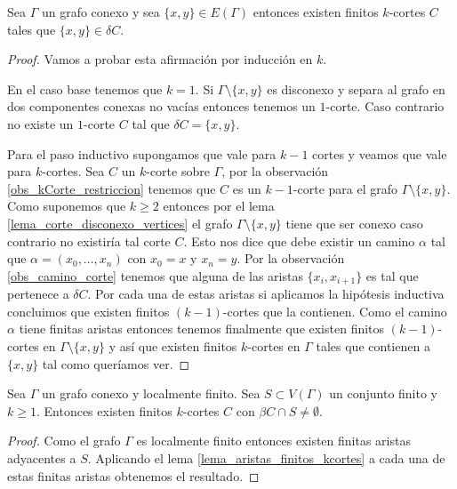 \documentclass[tesis.tex]{subfiles}
\begin{document}
\begin{prop}\label{lema_aristas_finitos_kcortes}
	Sea $\Gamma$ un grafo conexo y sea $\{x,y\} \in E(\Gamma)$ entonces existen finitos $k$-cortes $C$ tales que $\{x,y\} \in \delta C$.
\end{prop}

\begin{proof}
	Vamos a probar esta afirmación por inducción en $k$.
	
	En el caso base tenemos que $k=1$. 
	Si $\Gamma \setminus \{x,y\}$ es disconexo y separa al grafo en dos componentes conexas no vacías entonces tenemos un $1$-corte. 
	Caso contrario no existe un $1$-corte $C$ tal que $\delta C = \{x,y\}$.
	
	Para el paso inductivo supongamos que vale para $k-1$ cortes y veamos que vale para $k$-cortes.
	Sea $C$ un $k$-corte sobre $\Gamma$, por la observación \ref{obs_kCorte_restriccion} tenemos que $C$ es un $k-1$-corte para el grafo $\Gamma \setminus \{x,y\}$.
	Como suponemos que $k \ge 2$ entonces por el lema \ref{lema_corte_disconexo_vertices} el grafo $\Gamma \setminus \{x,y\}$ tiene que ser conexo caso contrario no existiría tal corte $C$.
	Esto nos dice que debe existir un camino $\alpha$ tal que $\alpha = (x_{0}, \dots, x_{n})$ con $x_{0} = x$ y $x_{n} = y$.
	Por la observación \ref{obs_camino_corte} tenemos que alguna de las aristas $\{x_{i},x_{i+1}\}$ es tal que pertenece a $\delta C$.
	Por cada una de estas aristas si aplicamos la hipótesis inductiva concluimos que existen finitos $(k-1)$-cortes que la contienen.
	Como el camino $\alpha$ tiene finitas aristas entonces tenemos finalmente que existen finitos $(k-1)$-cortes en $\Gamma \setminus \{x,y\}$ y así que existen finitos $k$-cortes en $\Gamma$ tales que contienen a $\{x,y\}$ tal como queríamos ver.
	
\end{proof}




\begin{coro}\label{lema_finitos_kcortes}
	Sea $\Gamma$ un grafo conexo y localmente finito.
	Sea $S \subset V(\Gamma)$ un conjunto finito y $k\ge 1$.
	Entonces existen finitos $k$-cortes $C$ con $\beta C \cap S \neq \emptyset$.
\end{coro}	

\begin{proof}
	Como el grafo $\Gamma$ es localmente finito entonces existen finitas aristas adyacentes a $S$.
	Aplicando el lema \ref{lema_aristas_finitos_kcortes} a cada una de estas finitas aristas obtenemos el resultado.	
\end{proof}
	
\end{document}
